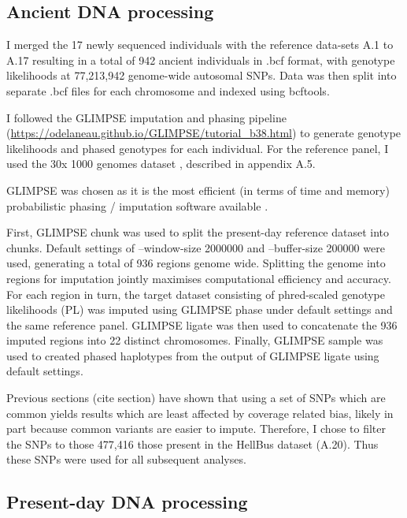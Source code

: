 \subsection{Ancient DNA processing} \label{AncientDNAprocessing}

I merged the 17 newly sequenced individuals with the reference data-sets A.1 to A.17 resulting in a total of 942 ancient individuals in .bcf format, with genotype likelihoods at 77,213,942 genome-wide autosomal SNPs. Data was then split into separate .bcf files for each chromosome and indexed using bcftools.

I followed the GLIMPSE \cite{rubinacci2021efficient} imputation and phasing pipeline (\url{https://odelaneau.github.io/GLIMPSE/tutorial_b38.html}) to generate genotype likelihoods and phased genotypes for each individual. For the reference panel, I used the 30x 1000 genomes dataset \cite{byrska2021high}, described in appendix A.5.  

GLIMPSE was chosen as it is the most efficient (in terms of time and memory) probabilistic phasing / imputation software available \cite{rubinacci2021efficient}. 

First, GLIMPSE chunk was used to split the present-day reference dataset into chunks. Default settings of --window-size 2000000 and --buffer-size 200000 were used, generating a total of 936 regions genome wide. Splitting the genome into regions for imputation jointly maximises computational efficiency and accuracy. For each region in turn, the target dataset consisting of phred-scaled genotype likelihoods (PL) was imputed using GLIMPSE phase under default settings and the same reference panel. GLIMPSE ligate was then used to concatenate the 936 imputed regions into 22 distinct chromosomes. Finally, GLIMPSE sample was used to created phased haplotypes from the output of GLIMPSE ligate using default settings.

Previous sections (cite section) have shown that using a set of SNPs which are common yields results which are least affected by coverage related bias, likely in part because common variants are easier to impute. Therefore, I chose to filter the SNPs to those 477,416 those present in the HellBus dataset (A.20). Thus these SNPs were used for all subsequent analyses. 

\subsection{Present-day DNA processing} \label{PresentdayDNAprocessing}

